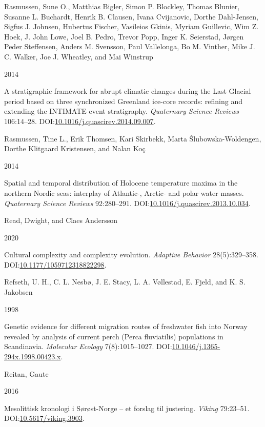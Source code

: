 \documentclass[
  12pt,
  a4paper,
  oneside]{book}
\newlength{\cslhangindent}
\newlength{\csllabelwidth}
\newlength{\cslentryspacingunit} %
\newenvironment{CSLReferences}[2] %
 {%
  \setlength{\parindent}{0pt}
  \ifodd #1
  \let\oldpar\par
  \def\par{\hangindent=\cslhangindent\oldpar}
  \fi
  \setlength{\parskip}{#2\cslentryspacingunit}
 }%
 {}
\newcommand{\CSLBlock}[1]{#1\hfill\break}
\newcommand{\CSLLeftMargin}[1]{\parbox[t]{\csllabelwidth}{#1}}
\newcommand{\CSLRightInline}[1]{\parbox[t]{\linewidth - \csllabelwidth}{#1}\break}
\begin{document}
\begin{CSLReferences}{0}{0}
\leavevmode{}%
\CSLBlock{Rasmussen, Sune O., Matthias Bigler, Simon P. Blockley, Thomas Blunier, Susanne L. Buchardt, Henrik B. Clausen, Ivana Cvijanovic, Dorthe Dahl-Jensen, Sigfus J. Johnsen, Hubertus Fischer, Vasileios Gkinis, Myriam Guillevic, Wim Z. Hoek, J. John Lowe, Joel B. Pedro, Trevor Popp, Inger K. Seierstad, Jørgen Peder Steffensen, Anders M. Svensson, Paul Vallelonga, Bo M. Vinther, Mike J. C. Walker, Joe J. Wheatley, and Mai Winstrup}
\CSLLeftMargin{ 2014}
\CSLRightInline{{A stratigraphic framework for abrupt climatic changes during the Last Glacial period based on three synchronized Greenland ice-core records: refining and extending the INTIMATE event stratigraphy}. \emph{Quaternary Science Reviews} 106:14--28. DOI:\href{https://doi.org/10.1016/j.quascirev.2014.09.007}{10.1016/j.quascirev.2014.09.007}.}

\leavevmode{}%
\CSLBlock{Rasmussen, Tine L., Erik Thomsen, Kari Skirbekk, Marta Ślubowska-Woldengen, Dorthe Klitgaard Kristensen, and Nalan Koç}
\CSLLeftMargin{ 2014}
\CSLRightInline{{Spatial and temporal distribution of Holocene temperature maxima in the northern Nordic seas: interplay of Atlantic-, Arctic- and polar water masses}. \emph{Quaternary Science Reviews} 92:280--291. DOI:\href{https://doi.org/10.1016/j.quascirev.2013.10.034}{10.1016/j.quascirev.2013.10.034}.}

\leavevmode{}%
\CSLBlock{Read, Dwight, and Claes Andersson}
\CSLLeftMargin{ 2020}
\CSLRightInline{{Cultural complexity and complexity evolution}. \emph{Adaptive Behavior} 28(5):329--358. DOI:\href{https://doi.org/10.1177/1059712318822298}{10.1177/1059712318822298}.}

\leavevmode{}%
\CSLBlock{Refseth, U. H., C. L. Nesbø, J. E. Stacy, L. A. Vøllestad, E. Fjeld, and K. S. Jakobsen}
\CSLLeftMargin{ 1998}
\CSLRightInline{Genetic evidence for different migration routes of freshwater fish into Norway revealed by analysis of current perch (Perca fluviatilis) populations in Scandinavia. \emph{Molecular Ecology} 7(8):1015--1027. DOI:\href{https://doi.org/10.1046/j.1365-294x.1998.00423.x}{10.1046/j.1365-294x.1998.00423.x}.}

\leavevmode{}%
\CSLBlock{Reitan, Gaute}
\CSLLeftMargin{ 2016}
\CSLRightInline{{Mesolittisk kronologi i Sørøst-Norge -- et forslag til justering}. \emph{Viking} 79:23--51. DOI:\href{https://doi.org/10.5617/viking.3903}{10.5617/viking.3903}.}


\end{CSLReferences}
\end{document}
